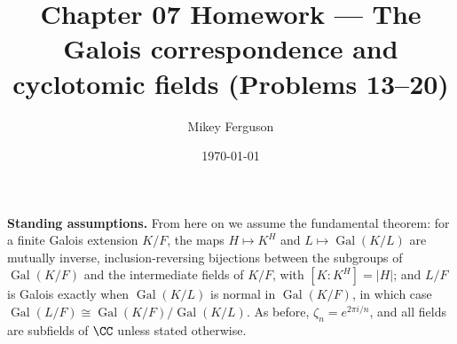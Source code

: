 \documentclass[11pt]{article}
\title{Chapter 07 Homework --- The Galois correspondence and cyclotomic fields (Problems 13--20)}
\author{Mikey Ferguson}
\date{\today}
\begin{document}
\maketitle

\noindent\textbf{Standing assumptions.} From here on we assume the fundamental theorem: for a finite Galois extension $K/F$, the maps $H\mapsto K^H$ and $L\mapsto \operatorname{Gal}(K/L)$ are mutually inverse, inclusion-reversing bijections between the subgroups of $\operatorname{Gal}(K/F)$ and the intermediate fields of $K/F$, with $[K:K^H]=|H|$; and $L/F$ is Galois exactly when $\operatorname{Gal}(K/L)$ is normal in $\operatorname{Gal}(K/F)$, in which case $\operatorname{Gal}(L/F)\cong \operatorname{Gal}(K/F)/\operatorname{Gal}(K/L)$. As before, $\zeta_n=e^{2\pi i/n}$, and all fields are subfields of $\CC$ unless stated otherwise.
\end{document}

